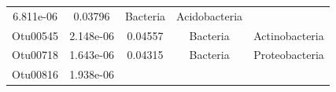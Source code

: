 \documentclass[]{article}
\begin{document}
\begin{longtable}[]{@{}ccccc@{}}
\begin{minipage}[t]{0.14\columnwidth}
6.811e-06\strut
\end{minipage} & \begin{minipage}[t]{0.13\columnwidth}\centering\strut
0.03796\strut
\end{minipage} & \begin{minipage}[t]{0.13\columnwidth}\centering\strut
Bacteria\strut
\end{minipage} & \begin{minipage}[t]{0.27\columnwidth}\centering\strut
Acidobacteria\strut
\end{minipage}\tabularnewline
\begin{minipage}[t]{0.13\columnwidth}\centering\strut
Otu00545\strut
\end{minipage} & \begin{minipage}[t]{0.14\columnwidth}\centering\strut
2.148e-06\strut
\end{minipage} & \begin{minipage}[t]{0.13\columnwidth}\centering\strut
0.04557\strut
\end{minipage} & \begin{minipage}[t]{0.13\columnwidth}\centering\strut
Bacteria\strut
\end{minipage} & \begin{minipage}[t]{0.27\columnwidth}\centering\strut
Actinobacteria\strut
\end{minipage}\tabularnewline
\begin{minipage}[t]{0.13\columnwidth}\centering\strut
Otu00718\strut
\end{minipage} & \begin{minipage}[t]{0.14\columnwidth}\centering\strut
1.643e-06\strut
\end{minipage} & \begin{minipage}[t]{0.13\columnwidth}\centering\strut
0.04315\strut
\end{minipage} & \begin{minipage}[t]{0.13\columnwidth}\centering\strut
Bacteria\strut
\end{minipage} & \begin{minipage}[t]{0.27\columnwidth}\centering\strut
Proteobacteria\strut
\end{minipage}\tabularnewline
\begin{minipage}[t]{0.13\columnwidth}\centering\strut
Otu00816\strut
\end{minipage} & \begin{minipage}[t]{0.14\columnwidth}\centering\strut
1.938e-06\strut
\end{minipage} & \begin{minipage}[t]{0.13\columnwidth}\centering\strut

\end{minipage}
\end{longtable}
\end{document}
